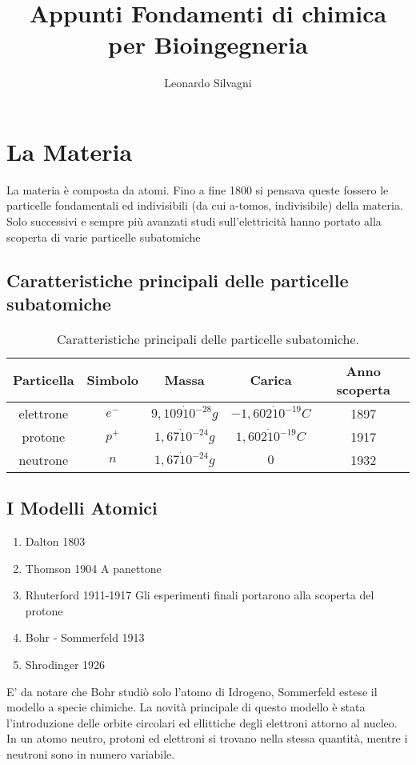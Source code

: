 \documentclass{article}
\title{Appunti Fondamenti di chimica per Bioingegneria}
\author{Leonardo Silvagni}
\begin{document}
\maketitle

\begin{abstract}

\end{abstract}

\section{La Materia}
La materia è composta da atomi. Fino a fine 1800 si pensava queste fossero le particelle fondamentali ed indivisibili (da cui a-tomos, indivisibile) della materia.  
Solo successivi e sempre più avanzati studi sull'elettricità hanno portato alla scoperta di varie particelle subatomiche
\subsection{Caratteristiche principali delle particelle subatomiche}

\begin{table}[H]
\centering
\begin{tabular}{c|c|c|c|c}
Particella & Simbolo & Massa & Carica & Anno scoperta \\\hline
elettrone & $e^-$ & $9,109\dot 10^{-28}g$ & $-1,602\dot 10^{-19}C$ & 1897 \\
protone & $p^+$ & $1,67\dot 10^{-24}g$ & $1,602\dot 10^{-19}C$ & 1917 \\
neutrone & $n$ & $1,67\dot 10^{-24}g$ & $0$ & 1932 
\end{tabular}
\caption{\label{tab:widgets}Caratteristiche principali delle particelle subatomiche.}
\end{table}
\subsection{I Modelli Atomici}
\begin{enumerate}
\item Dalton    1803
\item Thomson   1904 A panettone
\item Rhuterford    1911-1917 Gli esperimenti finali portarono alla scoperta del protone
\item Bohr - Sommerfeld     1913
\item Shrodinger    1926
\end{enumerate}
E' da notare che Bohr studiò solo l'atomo di Idrogeno, Sommerfeld estese il modello a specie chimiche. La novità principale di questo modello è stata l'introduzione delle orbite circolari ed ellittiche degli elettroni attorno al nucleo. 
In un atomo neutro, protoni ed elettroni si trovano nella stessa quantità, mentre i neutroni sono in numero variabile.
\end{document}
